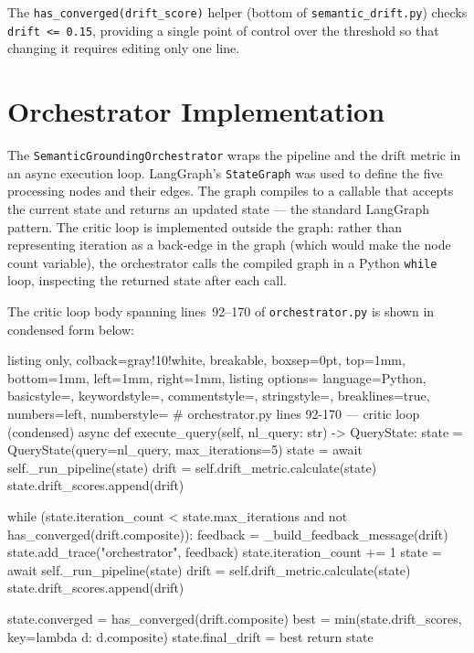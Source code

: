 \documentclass[12pt,a4paper]{report}
\begin{document}
The \texttt{has\_converged(drift\_score)} helper (bottom of \texttt{semantic\_drift.py}) checks \texttt{drift <= 0.15}, providing a single point of control over the threshold so that changing it requires editing only one line.

\section{Orchestrator Implementation}
\label{sec:orchestrator-impl}

The \texttt{SemanticGroundingOrchestrator} wraps the pipeline and the drift metric in an async execution loop. LangGraph's \texttt{StateGraph} was used to define the five processing nodes and their edges. The graph compiles to a callable that accepts the current state and returns an updated state — the standard LangGraph pattern. The critic loop is implemented outside the graph: rather than representing iteration as a back-edge in the graph (which would make the node count variable), the orchestrator calls the compiled graph in a Python \texttt{while} loop, inspecting the returned state after each call.

The critic loop body spanning lines~92--170 of \texttt{orchestrator.py} is shown in condensed form below:

\begin{tcblisting}{listing only, colback=gray!10!white, breakable, boxsep=0pt,
  top=1mm, bottom=1mm, left=1mm, right=1mm,
  listing options={
    language=Python, basicstyle=\small\ttfamily,
    keywordstyle=\color{kwcolor}, commentstyle=\color{cmtcolor},
    stringstyle=\color{strcolor}, breaklines=true,
    numbers=left, numberstyle=\tiny\color{gray}}}
# orchestrator.py lines 92-170 — critic loop (condensed)
async def execute_query(self, nl_query: str) -> QueryState:
    state = QueryState(query=nl_query, max_iterations=5)
    state = await self._run_pipeline(state)
    drift = self.drift_metric.calculate(state)
    state.drift_scores.append(drift)

    while (state.iteration_count < state.max_iterations
           and not has_converged(drift.composite)):
        feedback = _build_feedback_message(drift)
        state.add_trace("orchestrator", feedback)
        state.iteration_count += 1
        state = await self._run_pipeline(state)
        drift = self.drift_metric.calculate(state)
        state.drift_scores.append(drift)

    state.converged = has_converged(drift.composite)
    best = min(state.drift_scores, key=lambda d: d.composite)
    state.final_drift = best
    return state
\end{tcblisting}
\end{document}
